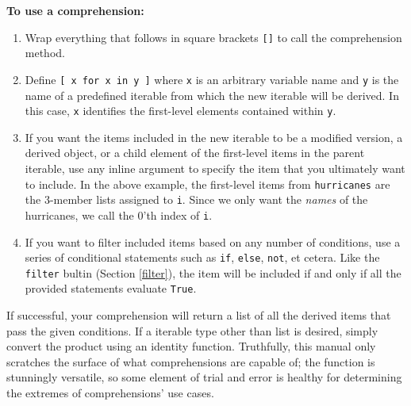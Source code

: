 \documentclass[12pt]{article}
\begin{document}
\vspace{1em}
\noindent
\textbf{To use a comprehension:}
\begin{enumerate}
	\item{Wrap everything that follows in square brackets \texttt{[]} to call the comprehension method.}
	\item{Define \texttt{[ x for x in y ]} where \texttt{x} is an arbitrary variable name and \texttt{y} is the name of a predefined iterable from which the new iterable will be derived. In this case, \texttt{x} identifies the first-level elements contained within \texttt{y}.}
	\item{If you want the items included in the new iterable to be a modified version, a derived object, or a child element of the first-level items in the parent iterable, use any inline argument to specify the item that you ultimately want to include. In the above example, the first-level items from \texttt{hurricanes} are the 3-member lists assigned to \texttt{i}. Since we only want the \textit{names} of the hurricanes, we call the $0$'th index of \texttt{i}.}
	\item{If you want to filter included items based on any number of conditions, use a series of conditional statements such as \texttt{if}, \texttt{else}, \texttt{not}, et cetera. Like the \texttt{filter} bultin (Section \ref{filter}), the item will be included if and only if all the provided statements evaluate \texttt{True}.}
\end{enumerate}

\noindent
If successful, your comprehension will return a list of all the derived items that pass the given conditions. If a iterable type other than list is desired, simply convert the product using an identity function. Truthfully, this manual only scratches the surface of what comprehensions are capable of; the function is stunningly versatile, so some element of trial and error is healthy for determining the extremes of comprehensions' use cases.


\printbibliography
\end{document}
